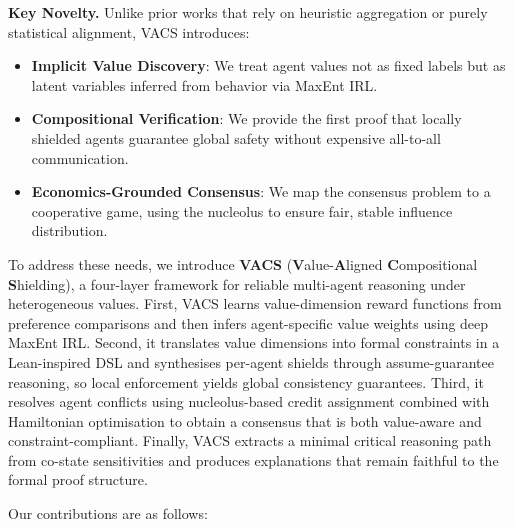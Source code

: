 \documentclass[12pt,a4paper]{article}
\begin{document}
\vspace{8pt}
\noindent\textbf{Key Novelty.} Unlike prior works that rely on heuristic aggregation or purely statistical alignment, VACS introduces:
\begin{itemize}[leftmargin=*,label=\textbullet]
    \item \textbf{Implicit Value Discovery}: We treat agent values not as fixed labels but as latent variables inferred from behavior via MaxEnt IRL.
    \item \textbf{Compositional Verification}: We provide the first proof that locally shielded agents guarantee global safety without expensive all-to-all communication.
    \item \textbf{Economics-Grounded Consensus}: We map the consensus problem to a cooperative game, using the nucleolus to ensure fair, stable influence distribution.
\end{itemize}
\vspace{8pt}


To address these needs, we introduce \textbf{VACS} (\textbf{V}alue-\textbf{A}ligned
\textbf{C}ompositional \textbf{S}hielding), a four-layer framework for reliable
multi-agent reasoning under heterogeneous values. First, VACS learns value-dimension reward
functions from preference comparisons and then infers agent-specific value weights using
deep MaxEnt IRL. Second, it translates value dimensions into formal constraints in a
Lean-inspired DSL and synthesises per-agent shields through assume-guarantee reasoning, so
local enforcement yields global consistency guarantees. Third, it resolves agent conflicts
using nucleolus-based credit assignment combined with Hamiltonian optimisation to obtain a
consensus that is both value-aware and constraint-compliant. Finally, VACS extracts a
minimal critical reasoning path from co-state sensitivities and produces explanations that
remain faithful to the formal proof structure.

Our contributions are as follows:
\end{document}
